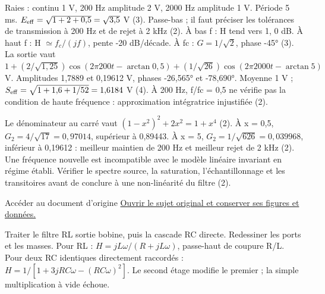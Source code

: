 Raies : continu 1 V, 200 Hz amplitude 2 V, 2000 Hz amplitude 1 V. Période 5 ms. $E_{\rm eff}=\sqrt{1+2+0{,}5}=\sqrt{3{,}5}$ V (3). Passe-bas ; il faut préciser les tolérances de transmission à 200 Hz et de rejet à 2 kHz (2).
À bas f : H tend vers 1, 0 dB. À haut f : H $\simeq f_c/(jf)$, pente -20 dB/décade. À fc : $G=1/\sqrt2$, phase -45° (3). La sortie vaut $1+(2/\sqrt{1{,}25})\cos(2\pi200t-\arctan0{,}5)+(1/\sqrt{26})\cos(2\pi2000t-\arctan5)$ V. Amplitudes 1,7889 et 0,19612 V, phases -26,565° et -78,690°. Moyenne 1 V ; $S_{\rm eff}=\sqrt{1+1{,}6+1/52}=1{,}6184$ V (4). À 200 Hz, f/fc = 0,5 ne vérifie pas la condition de haute fréquence : approximation intégratrice injustifiée (2).


Le dénominateur au carré vaut $(1-x^2)^2+2x^2=1+x^4$ (2). À x = 0,5, $G_2=4/\sqrt{17}=0{,}97014$, supérieur à 0,89443. À x = 5, $G_2=1/\sqrt{626}=0{,}039968$, inférieur à 0,19612 : meilleur maintien de 200 Hz et meilleur rejet de 2 kHz (2). Une fréquence nouvelle est incompatible avec le modèle linéaire invariant en régime établi. Vérifier le spectre source, la saturation, l’échantillonnage et les transitoires avant de conclure à une non-linéarité du filtre (2).


\begin{loi}{Accéder au document d’origine}
\href{https://mpsi.schleck.ovh/fichiers/td/td7_filtrage_lineaire.pdf}{Ouvrir le sujet original et conserver ses figures et données.}
\end{loi}
Traiter le filtre RL sortie bobine, puis la cascade RC directe. Redessiner les ports et les masses.
Pour RL : $H=jL\omega/(R+jL\omega)$, passe-haut de coupure R/L. Pour deux RC identiques directement raccordés : $H=1/[1+3jRC\omega-(RC\omega)^2]$. Le second étage modifie le premier ; la simple multiplication à vide échoue.

